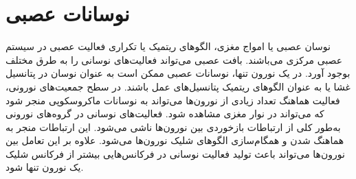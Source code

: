 \section{نوسانات عصبی}
نوسان عصبی یا امواج مغزی، الگوهای ریتمیک یا تکراری فعالیت عصبی در سیستم عصبی مرکزی می‌باشند. بافت عصبی می‌تواند فعالیت‌های نوسانی را به طرق مختلف بوجود آورد.
 در یک نورون‌ تنها، نوسانات عصبی ممکن است به عنوان نوسان در پتانسیل غشا یا به عنوان الگوهای ریتمیک پتانسیل‌های عمل
  باشند. در سطح جمعیت‌های نورونی، فعالیت هماهنگ تعداد زیادی از نورون‌ها می‌تواند به نوسانات ماکروسکوپی منجر شود که می‌تواند در نوار مغزی
  مشاهده شود. فعالیت‌های نوسانی در گروه‌های نورونی به‌طور کلی از ارتباطات بازخوردی بین نورون‌ها ناشی می‌شود. این ارتباطات منجر به هماهنگ شدن و همگام‌سازی الگوهای شلیک نورون‌ها می‌شود. علاوه بر این تعامل بین نورون‌ها می‌تواند باعث تولید فعالیت نوسانی در فرکانس‌هایی بیشتر از فرکانس شلیک یک نورون‌ تنها شود.
  
